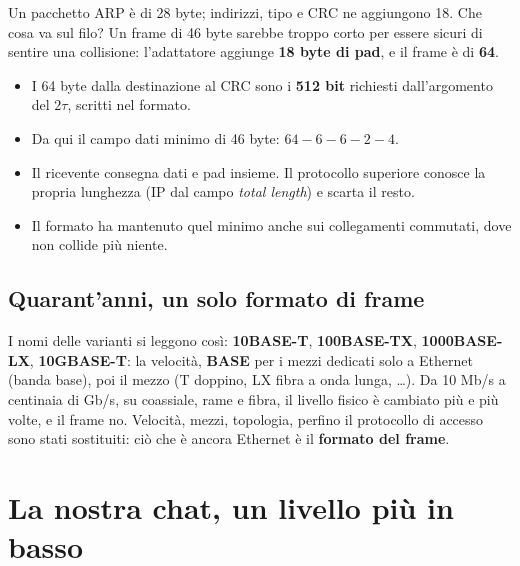 Un pacchetto ARP è di 28 byte; indirizzi, tipo e CRC ne aggiungono 18. Che cosa va sul filo? Un frame di 46 byte sarebbe troppo corto
per essere sicuri di sentire una collisione: l'adattatore aggiunge \textbf{18 byte di pad}, e il frame è di \textbf{64}.

\begin{itemize}
    \item I 64 byte dalla destinazione al CRC sono i \textbf{512 bit} richiesti dall'argomento del $2\tau$, scritti nel formato.
    \item Da qui il campo dati minimo di 46 byte: $64 - 6 - 6 - 2 - 4$.
    \item Il ricevente consegna dati e pad insieme. Il protocollo superiore conosce la propria lunghezza (IP dal campo
          \emph{total length}) e scarta il resto.
    \item Il formato ha mantenuto quel minimo anche sui collegamenti commutati, dove non collide più niente.
\end{itemize}


\subsection{Quarant'anni, un solo formato di frame}

I nomi delle varianti si leggono così: \textbf{10BASE-T}, \textbf{100BASE-TX}, \textbf{1000BASE-LX}, \textbf{10GBASE-T}: la velocità,
\textbf{BASE} per i mezzi dedicati solo a Ethernet (banda base), poi il mezzo (T doppino, LX fibra a onda lunga, \dots). Da 10 Mb/s a
centinaia di Gb/s, su coassiale, rame e fibra, il livello fisico è cambiato più e più volte, e il frame no. Velocità, mezzi,
topologia, perfino il protocollo di accesso sono stati sostituiti: ciò che è ancora Ethernet è il \textbf{formato del frame}.

\section{La nostra chat, un livello più in basso}

